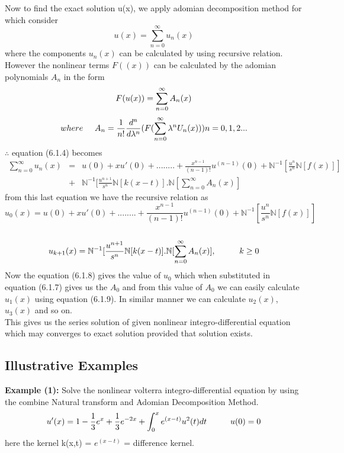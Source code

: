 Now to find the exact solution u(x), we apply adomian decomposition method for which consider
\begin{equation}
{u(x) = \sum_{n=0}^{\infty} u_{n}(x)}
\end{equation}
where the components $u_{n}(x)$ can be calculated by using recursive relation. However the nonlinear terms $F((x))$ can be calculated by the adomian polynomials $A_{n}$ in the form
\begin{equation}
 F(u(x)) = \sum_{n=0}^{\infty} A_{n}(x)\\
 \end{equation}
 \begin{equation}
{ where{\hspace{0.5cm}} A_{n} = \frac{1}{n!}\frac{d^n}{d\lambda^n}(F(\sum_{n=0}^{\infty} \lambda^nU_{n}(x)))}      n = 0,1,2...
 \end{equation}    
 $\therefore$    equation (6.1.4) becomes
 \begin{eqnarray*}
 \sum_{n=0}^{\infty} u_{n}(x) &=& u(0) + x u'(0) + ........+ \frac{x^{n-1}}{(n-1)!}u^{(n-1)}(0) + \mathbb{N}^{-1}[\frac{u^n}{s^n}\mathbb{N}[f(x)]]\\ 
 &+& \mathbb{N}^{-1}[\frac{u^{n+1}}{s^n}\mathbb{N}[k(x-t)].\mathbb{N}[\sum_{n=0}^{\infty} A_{n}(x)]
 \end{eqnarray*}
 from this last equation we have the recursive relation as
 \begin{equation}
{  u_{0}(x) = u(0) + x u'(0) + ........+ \frac{x^{n-1}}{(n-1)!}u^{(n-1)}(0) + \mathbb{N}^{-1}[\frac{u^n}{s^n}\mathbb{N}[f(x)]]}
 \end{equation}\\
 \begin{equation}
 {u_{k+1}(x) = \mathbb{N}^{-1}[\frac{u^{n+1}}{s^n}\mathbb{N}[k(x-t)].\mathbb{N}[\sum_{n=0}^{\infty} A_{n}(x)]}  ,\hspace{1cm} k \geq 0\\ 
 \end{equation}
 Now the equation (6.1.8) gives the value of $u_{0}$ which when substituted in equation (6.1.7) gives us the $A_{0}$ and from this value of $ A_{0}$ we can easily calculate $u_{1}(x)$ using equation (6.1.9). In similar manner we can calculate $u_{2}(x)$, $u_{3}(x)$ and so on.\\
  This gives us the series solution of given nonlinear integro-differential equation which may converges to exact solution provided that solution exists.
 \subsection{Illustrative Examples} 
 \textbf{Example (1):} Solve the nonlinear volterra integro-differential equation by using the combine Natural transform and Adomian Decomposition Method.
 \begin{equation*}
 {u'(x) = 1 - \frac{1}{3}e^{x} + \frac{1}{3}e^{-2x} + \int_{0}^{x}e^{(x-t)}u^2(t) dt {\hspace{1 cm}} u(0) = 0}
 \end{equation*}
here the kernel k(x,t) =  $e^{(x-t)}$ = difference kernel.\\

